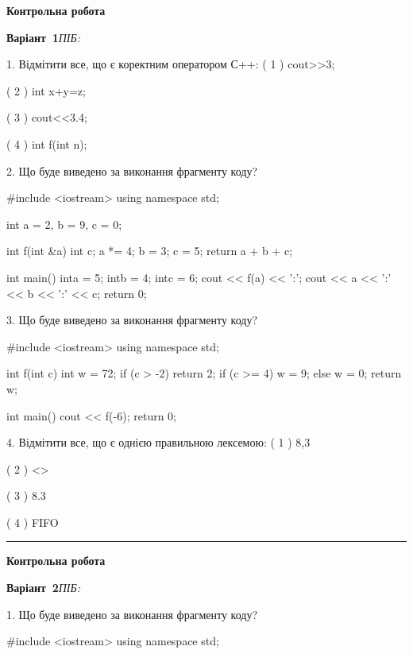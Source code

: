 \documentclass[11pt]{article}
\begin{document}
{\large\textbf{Контрольна робота}}

\textbf{Варіант \No\,1}\hfill \textit{ПІБ:}\,\underline{\hspace{60mm}}
\vspace{4mm}

1. Відмітити все, що є коректним оператором С++:
( 1 ) cout>>3;

( 2 ) int x+y=z;

( 3 ) cout<<3.4;

( 4 ) int f(int n);

2. Що буде виведено за виконання фрагменту коду?

#include <iostream>
using namespace std;

int a = 2, b = 9, c = 0;

int f(int &a){
int c;    a *= 4;
    b = 3;
    c = 5;
    return a + b + c;
}

int main(){
    inta = 5;
    intb = 4;
    intc = 6;
    cout << f(a) << ':';
    cout << a << ':' << b << ':' << c;
    return 0; 
}

3. Що буде виведено за виконання фрагменту коду?

#include <iostream>
using namespace std;

int f(int c){
    int w = 72;
    if (c > -2) 
        return 2;
    if (c >= 4)
         w = 9;
    else
         w = 0;
    return w;
}

int main(){
    cout << f(-6);
    return 0;
}


4. Відмітити все, що є однією правильною лексемою:
( 1 ) 8,3

( 2 ) <>

( 3 ) 8.3

( 4 ) FIFO





\vspace{10mm}
\noindent\rule{\textwidth}{0.3pt}
\vspace{8mm}
{\large\textbf{Контрольна робота}}

\textbf{Варіант \No\,2}\hfill \textit{ПІБ:}\,\underline{\hspace{60mm}}
\vspace{4mm}

1. Що буде виведено за виконання фрагменту коду?

#include <iostream>
using namespace std;
\end{document}
